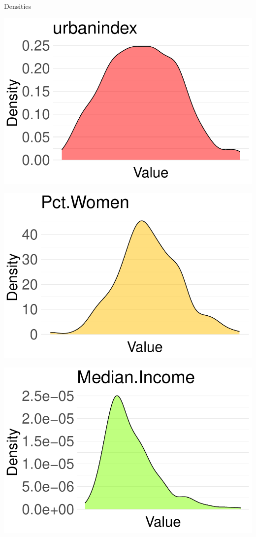 \documentclass{beamer}
\begin{document}
\begin{frame}{Densities}
    \centering
    \begin{minipage}{0.3\textwidth}
        \centering
        \includegraphics[width=\textwidth]{plots/urbanindex_density_plot.pdf}
    \end{minipage}
    \hfill
    \begin{minipage}{0.3\textwidth}
        \centering
        \includegraphics[width=\textwidth]{plots/Pct.Women_density_plot.pdf}
    \end{minipage}
    \hfill
    \begin{minipage}{0.3\textwidth}
        \centering
        \includegraphics[width=\textwidth]{plots/Median.Income_density_plot.pdf}
    \end{minipage}
    

\end{frame}
\end{document}
